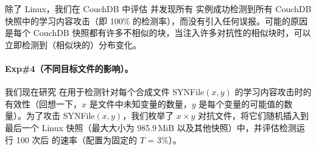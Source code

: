 除了 Linux，我们在 CouchDB 中评估 \sysnameF 并发现所有 \sysnameF 实例成功检测到所有 CouchDB 快照中的学习内容攻击（即 100\% 的检测率），而没有引入任何误报。可能的原因是每个 CouchDB 快照都有许多不相似的块，当注入许多对抗性的相似块时，\sysnameF 可以立即检测到（相似块的）分布变化。


\paragraph*{Exp\#4（不同目标文件的影响）。}
我们现在研究 \sysnameF 在用于检测针对每个合成文件 SYNFile$(x, y)$ 的学习内容攻击时的有效性（回想一下，$x$ 是文件中未知变量的数量，$y $ 是每个变量的可能值的数量）。为了攻击 SYNFile$(x, y)$，我们枚举了 $x\times y$ 对抗文件，将它们随机插入到最后一个 Linux 快照（最大大小为 985.9\,MiB 以及其他快照）中，并评估检测运行 100 次后 \sysnameF 的速率（配置为固定的 $T$ = 3\%）。


